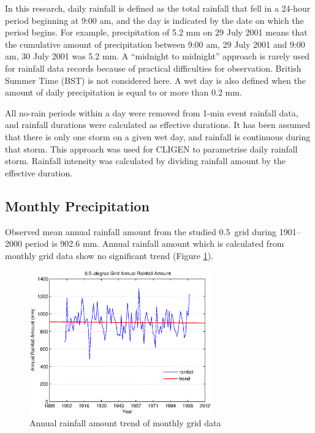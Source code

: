 In this research, daily rainfall is defined as the total rainfall that fell in a
24-hour period beginning at 9:00 am, and the day is indicated by the date on
which the period begins. For example, precipitation of 5.2 mm on 29 July 2001
means that the cumulative amount of precipitation between 9:00 am, 29 July 2001
and 9:00 am, 30 July 2001 was 5.2 mm. A ``midnight to midnight'' approach is
rarely used for rainfall data records because of practical difficulties for
observation. British Summer Time (BST) is not considered here. A wet day is also
defined when the amount of daily precipitation is equal to or more than 0.2 mm.

All no-rain periods within a day were removed from 1-min event rainfall data,
and rainfall durations were calculated as effective durations. It has been
assumed that there is only one storm on a given wet day, and rainfall is
continuous during that storm. This approach was used for CLIGEN to parametrise
daily rainfall storm. Rainfall intensity was calculated by dividing rainfall
amount by the effective duration.

\subsection{Monthly Precipitation}
\label{sec:HalfDegreeGridMonthlyPrecipitationData}

Observed mean annual rainfall amount from the studied 0.5\textdegree\ grid
during 1901--2000 period is 902.6 mm.
Annual rainfall amount which is calculated from monthly grid data show no
significant trend (Figure \ref{fig:grid_annual_amount}).

\begin{figure}[htbp]
  \centering
    \includegraphics[width=0.7\textwidth]{./img/grid_annual_amount}
  \caption{Annual rainfall amount trend of monthly grid data}
  \label{fig:grid_annual_amount}
\end{figure}

